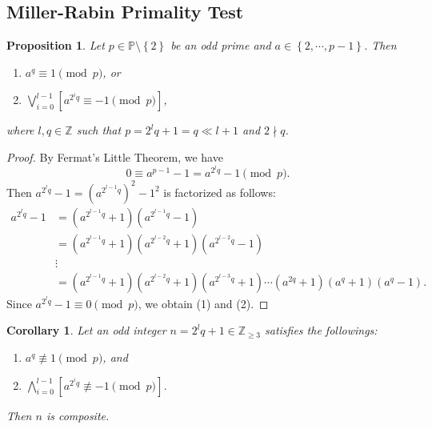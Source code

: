 \documentclass[12pt,openany]{book}
\newtheorem{proposition}[theorem]{Proposition}
\newtheorem{corollary}{Corollary}[theorem]
\theoremstyle{definition}
\newcommand{\set}[1]{\left\{#1\right\}}
\newcommand{\Z}{\mathbb{Z}}
\newcommand{\of}[1]{\left( #1 \right)}
\begin{document}
	\newpage
	\subsection{Miller-Rabin Primality Test}
	\begin{tcolorbox}[colback=white,colframe=procolor,arc=5pt,title={\color{white}\bf }]
		\begin{proposition}
			Let $p\in\mathbb{P}\setminus\set{2}$ be an odd prime and $a\in\set{2,\cdots,p-1}$. Then
			\begin{enumerate}[(1)]
				\item $a^q\equiv 1\pmod{p}$, or
				\item $\displaystyle\bigvee_{i=0}^{l-1}\left[a^{2^iq}\equiv -1\pmod{p}\right]$,
			\end{enumerate} where $l,q\in\Z$ such that $p=2^lq+1=q\ll l+1$ and $2\nmid q$.
		\end{proposition}
	\end{tcolorbox}
	\begin{proof}
		By Fermat's Little Theorem, we have \[
		0\equiv a^{p-1}-1=a^{2^lq}-1\pmod{p}.
		\] Then $a^{2^lq}-1=(a^{2^{l-1}q})^2-1^2$ is factorized as follows: \begin{align*}
			a^{2^lq}-1&=\of{a^{2^{l-1}q}+1}\of{a^{2^{l-1}q}-1}\\
			&=\of{a^{2^{l-1}q}+1}\of{a^{2^{l-2}q}+1}\of{a^{2^{l-2}q}-1}\\
			&\vdots\\
			&=\of{a^{2^{l-1}q}+1}\of{a^{2^{l-2}q}+1}\of{a^{2^{l-3}q}+1}\cdots\of{a^{2q}+1}\of{a^{q}+1}\of{a^{q}-1}.
		\end{align*} Since $a^{2^lq}-1\equiv 0\pmod{p}$, we obtain (1) and (2).
	\end{proof}
	\vspace{4pt}
	\begin{tcolorbox}[colback=white,colframe=corcolor,arc=5pt,title={\color{white}\bf Miller-Rabin's Test}]
		\begin{corollary}
			Let an odd integer $n=2^lq+1\in\Z_{\geq 3}$ satisfies the followings: \begin{enumerate}
				\item $a^q\not\equiv 1\pmod{p}$, and
				\item $\displaystyle\bigwedge_{i=0}^{l-1}\left[a^{2^iq}\not\equiv -1\pmod{p}\right]$.
			\end{enumerate} Then $n$ is composite.
		\end{corollary}
	\end{tcolorbox}
	
\end{document}
